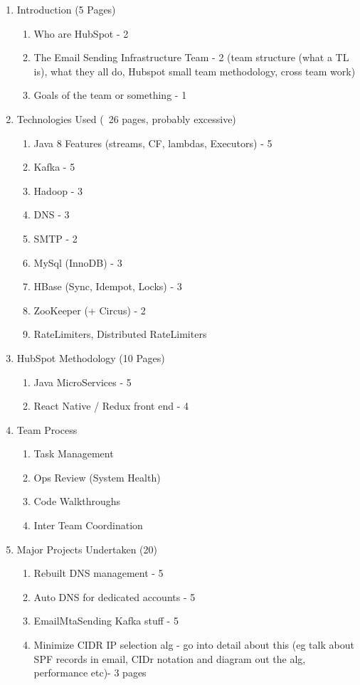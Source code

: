 

\begin{enumerate}
	\item Introduction (5 Pages)
	\begin{enumerate}
    	\item Who are HubSpot - 2
        \item The Email Sending Infrastructure Team - 2 (team structure (what a TL is), what they all do, Hubspot small team methodology, cross team work)
        \item Goals of the team or something - 1
    \end{enumerate}
    
    \item Technologies Used (~26 pages, probably excessive)
    \begin{enumerate}
    	\item Java 8 Features (streams, CF, lambdas, Executors) - 5
        \item Kafka - 5
        \item Hadoop - 3
        \item DNS - 3
        \item SMTP - 2
        \item MySql (InnoDB) - 3
        \item HBase (Sync, Idempot, Locks) - 3
        \item ZooKeeper (+ Circus) - 2
        \item RateLimiters, Distributed RateLimiters
    \end{enumerate}
    
    \item HubSpot Methodology (10 Pages)
    \begin{enumerate}
    	\item Java MicroServices - 5
        \item React Native / Redux front end - 4
    \end{enumerate}
    
	\item Team Process
	\begin{enumerate}
		\item Task Management
		\item Ops Review (System Health)
		\item Code Walkthroughs
		\item Inter Team Coordination
	\end{enumerate}	    
    
    \item Major Projects Undertaken (20)
    \begin{enumerate}
    	\item Rebuilt DNS management - 5
        \item Auto DNS for dedicated accounts - 5
    	\item EmailMtaSending Kafka stuff - 5
    	\item Minimize CIDR IP selection alg - go into detail about this (eg talk about SPF records in email, CIDr notation and diagram out the alg, performance etc)- 3 pages
    \end{enumerate}
    
\end{enumerate}
